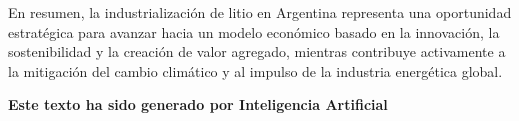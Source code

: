 \documentclass[crop=false]{standalone}
\begin{document}
En resumen, la industrialización de litio en Argentina representa una oportunidad estratégica para avanzar hacia un modelo económico basado en la innovación, la sostenibilidad y la creación de valor agregado, mientras contribuye activamente a la mitigación del cambio climático y al impulso de la industria energética global.

\textbf{Este texto ha sido generado por Inteligencia Artificial}







\end{document}
